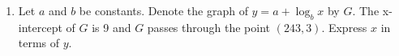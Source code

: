 \documentclass[11pt]{article}
\begin{document}
\begin{enumerate}
            \hrulefill
            
            \hrulefill
            
            \hrulefill
            
            \hrulefill
            
            \hrulefill
            
            \hrulefill
            
            \hrulefill
            
            \hrulefill

        \pagebreak
        \item Let $a$ and $b$ be constants. Denote the graph of $y=a+\log_b{x}$ by $G$. The x-intercept of $G$ is 9 and $G$ passes through the point $(243,3)$. Express $x$ in terms of $y$.
        
        \hrulefill
            
            \hrulefill
            
            \hrulefill
            
            \hrulefill
            
            \hrulefill
            
            \hrulefill
            
            \hrulefill
            
            \hrulefill
            
            \hrulefill
            
            \hrulefill

            \hrulefill
            
            \hrulefill
            
            \hrulefill
            
            \hrulefill
            
            \hrulefill
            
            \hrulefill
            
            \hrulefill
            
            \hrulefill
            
            \hrulefill
            
            \hrulefill
            
            \hrulefill
            
            \hrulefill
            
            \hrulefill
            

\end{enumerate}
\end{document}
